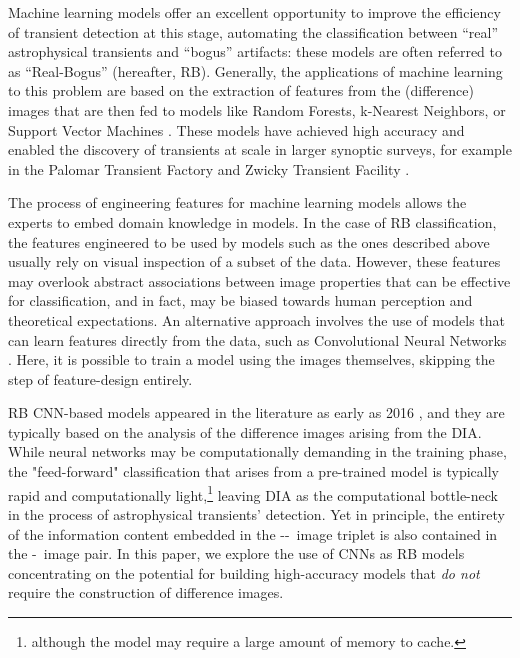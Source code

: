 

Machine learning models offer an excellent opportunity to improve the efficiency of transient detection at this stage, automating the classification between ``real'' astrophysical transients and ``bogus'' artifacts: these models are often referred to as ``Real-Bogus'' (hereafter, RB). Generally, the applications of machine learning to this problem are based on the extraction of features from the (difference) images that are then fed to models like Random Forests, k-Nearest Neighbors, or Support Vector Machines \citep{Goldstein_2015, S_nchez_2019, Mong_2020}. These models have achieved high accuracy and enabled the discovery of transients at scale in larger synoptic surveys, for example in the Palomar Transient Factory \citep[PTF][]{bloom2012automating} and Zwicky Transient Facility \citep[ZTF][]{2019PASP..131c8002M}. 

The process of engineering features for machine learning models allows the experts to embed domain knowledge in models. In the case of RB classification, the features engineered to be used by models such as the ones described above usually rely on visual inspection of a subset of the data. However, these features may overlook abstract associations between image properties that can be effective for classification, and in fact, may be biased towards human perception and theoretical expectations. An alternative approach involves the use of models that can learn features directly from the data, such as Convolutional Neural Networks \citep[CNNs]{lecun1989generalization}.  Here, it is possible to train a model using the images themselves, skipping the step of feature-design entirely.

RB CNN-based models appeared in the literature as early as 2016 \citep{Cabrera_2016}, and they are typically based on the analysis of the difference images arising from the DIA. While neural networks may be computationally demanding in the training phase, the "feed-forward" classification that arises from a pre-trained model is typically rapid and computationally light,\footnote{although the model may require a large amount of memory to cache.} leaving DIA as the computational bottle-neck in the process of astrophysical transients' detection. Yet in principle, the entirety of the information content embedded in the \diff-\temp-\search\ image triplet is also contained in the \temp-\search\ image pair.  In this paper, we explore the use of CNNs as RB models %
concentrating on the potential for building high-accuracy models that \textit{do not} require the construction of difference images.  


